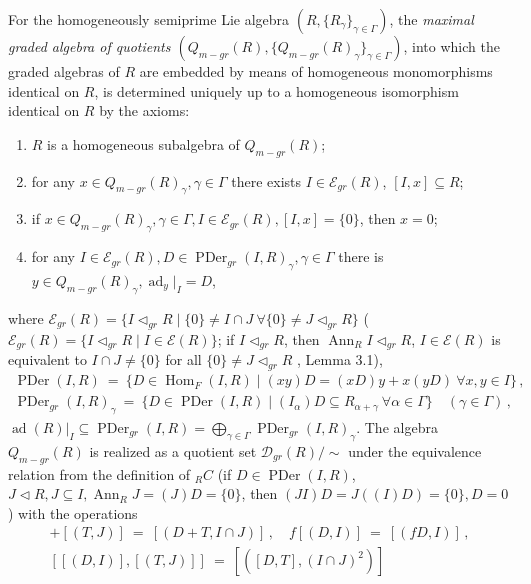 \documentclass[a4paper,11pt]{article}
\DeclareMathOperator{\ad}{ad}
\DeclareMathOperator{\Hom}{Hom}
\DeclareMathOperator{\Ann}{Ann}
\DeclareMathOperator{\PDer}{PDer}
\begin{document}
For the homogeneously semiprime Lie algebra 
${(R, \{R_{\gamma}\}_{\gamma\in \Gamma})}$, the \emph{maximal graded algebra 
of quotients ${(Q_{m-gr}(R), \{Q_{m-gr}(R)_{\gamma}\}_{\gamma\in \Gamma})}$}, 
into which the graded algebras of $R$ are embedded by means of homogeneous 
monomorphisms identical on $R$, is determined uniquely up to a homogeneous 
isomorphism identical on $R$ by the axioms: 
\begin{enumerate}

\item $R$ is a homogeneous subalgebra of $Q_{m-gr}(R)$; 

\item for any ${x\in Q_{m-gr}(R)_{\gamma}, \gamma\in \Gamma}$ there exists 
${I\in \mathcal{E}_{gr}(R)}$, ${[I, x]\subseteq R}$; 

\item if ${x\in Q_{m-gr}(R)_{\gamma}, \gamma\in \Gamma, 
I\in \mathcal{E}_{gr}(R), [I, x]=\{0\}}$, then ${x=0}$; 

\item for any ${I\in \mathcal{E}_{gr}(R), D\in \PDer_{gr}(I, R)_{\gamma}, 
\gamma\in \Gamma}$ there is ${y\in Q_{m-gr}(R)_{\gamma}, \ad_y|_I=D}$, 

\end{enumerate}
where ${\mathcal{E}_{gr}(R)=\{I\lhd_{gr} R\mid \{0\}\ne I\cap J\ \forall 
\{0\}\ne J\lhd_{gr} R\}}$ 
(${\mathcal{E}_{gr}(R)=\{I\lhd_{gr} R\mid I\in \mathcal{E}(R)\}}$; 
if ${I\lhd_{gr} R}$, then ${\Ann_R I\lhd_{gr} R}$, 
${I\in \mathcal{E}(R)}$ is equivalent to ${I\cap J\ne \{0\}}$ for all 
${\{0\}\ne J\lhd_{gr} R}$ \cite{OMol}, Lemma 3.1), 
\begin{gather*}
\PDer(I, R)\ =\ 
\{D\in \Hom_F(I, R)\mid (x y) D=(x D) y+x (y D)\ \forall x, y\in I\}\,,
\\
\PDer_{gr}(I, R)_{\gamma}\ =\ \{D\in \PDer(I, R)\mid (I_{\alpha})D\subseteq 
R_{\alpha+\gamma}\ \forall \alpha\in \Gamma\}\quad (\gamma\in \Gamma)\,,
\end{gather*}
${\ad(R)|_I\subseteq \PDer_{gr}(I, R)=
\bigoplus\limits_{\gamma\in \Gamma} \PDer_{gr}(I, R)_{\gamma}}$. The algebra 
$Q_{m-gr}(R)$ is realized as a quotient set 
$\mathcal{D}_{gr}(R)/\sim$ under the equivalence relation from the definition 
of ${}_R C$ (if ${D\in \PDer(I, R)}$, ${J\lhd R, J\subseteq I, 
\Ann_R J=(J)D=\{0\}}$, then ${(J I)D=J((I)D)=\{0\}, D=0}$) with the operations  
\begin{gather*}
[(D, I)]+[(T, J)]\ =\ [(D+T, I\cap J)]\,,\quad f [(D, I)]\ =\ [(f D, I)]\,,
\\
[[(D, I)], [(T, J)]]\ =\ [([D, T], (I\cap J)^2)]
\end{gather*}
\end{document}
